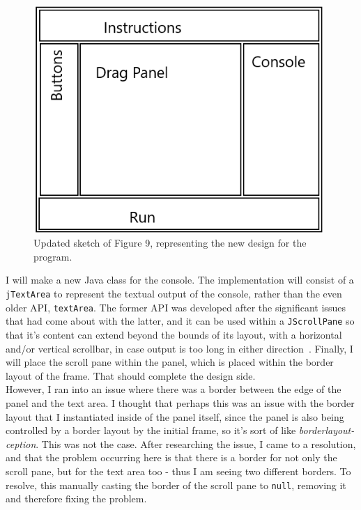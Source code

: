 \documentclass[a4paper, 12pt]{article}
\begin{document}
            \begin{figure}[h]
                \centering
                \includegraphics[width=110mm]{design_updated.png}
                \caption{Updated sketch of Figure 9, representing the new design for the program.}
            \end{figure}

            I will make a new Java class for the console. The implementation will consist of a \texttt{jTextArea}
            to represent the textual output of the console, rather than the even older API, \texttt{textArea}.
            The former API was developed after the significant issues that had come about with the latter,
            and it can be used within a \texttt{JScrollPane} so that it's content can extend beyond the
            bounds of its layout, with a horizontal and/or vertical scrollbar, in case output is too long
            in either direction~\cite{jTextArea}. Finally, I will place the scroll pane within the panel, which
            is placed within the border layout of the frame. That should complete the design side. \\

            However, I ran into an issue where there was a border between the edge of the panel and the text area. I thought
            that perhaps this was an issue with the border layout that I instantiated inside of the panel itself,
            since the panel is also being controlled by a border layout by the initial frame, so it's sort of like
            \textit{borderlayout-ception}. This was not the case. After researching the issue, I came to a
            resolution, and that the problem occurring here is that there is a border for not only the scroll pane,
            but for the text area too - thus I am seeing two different borders. To resolve, this manually casting the
            border of the scroll pane to \texttt{null}, removing it and therefore fixing the problem.
\end{document}
